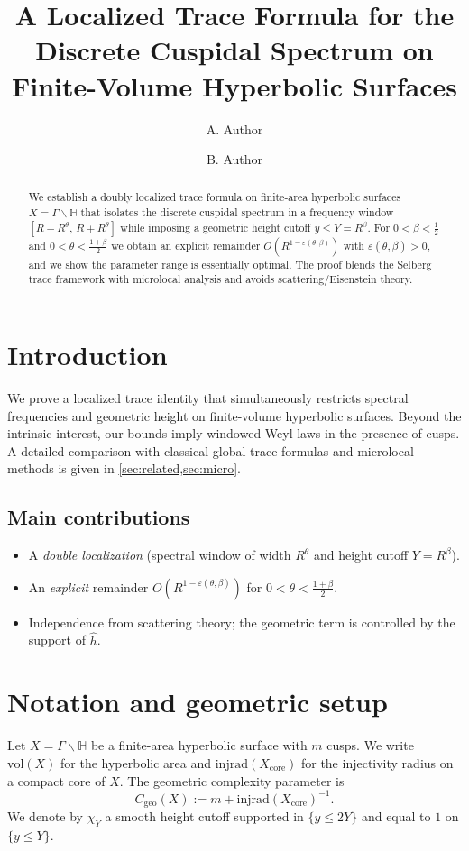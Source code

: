 \documentclass[11pt]{amsart}
\title[A Localized Trace Formula]{A Localized Trace Formula for the Discrete Cuspidal Spectrum on Finite-Volume Hyperbolic Surfaces}
\author{A. Author}
\author{B. Author}
\numberwithin{equation}{section}
\theoremstyle{definition}
\theoremstyle{remark}
\newcommand{\HH}{\mathbb{H}}
\newcommand{\vol}{\mathrm{vol}}
\newcommand{\injrad}{\mathrm{injrad}}
\begin{document}
\begin{abstract}
We establish a doubly localized trace formula on finite-area hyperbolic surfaces
$X=\Gamma\backslash\HH$ that isolates the discrete cuspidal spectrum in a frequency
window $[R-R^\theta,\,R+R^\theta]$ while imposing a geometric height cutoff $y\le Y=R^\beta$.
For $0<\beta<\tfrac12$ and $0<\theta<\tfrac{1+\beta}{2}$ we obtain an explicit remainder
$O\!\left(R^{1-\varepsilon(\theta,\beta)}\right)$ with $\varepsilon(\theta,\beta)>0$, and we
show the parameter range is essentially optimal. The proof blends the Selberg trace
framework with microlocal analysis and avoids scattering/Eisenstein theory.
\end{abstract}

\maketitle

\section{Introduction}
We prove a localized trace identity that simultaneously restricts spectral
frequencies and geometric height on finite-volume hyperbolic surfaces. Beyond
the intrinsic interest, our bounds imply windowed Weyl laws in the presence of cusps.
A detailed comparison with classical global trace formulas and microlocal methods
is given in \cref{sec:related,sec:micro}.

\subsection*{Main contributions}
\begin{itemize}
  \item A \emph{double localization} (spectral window of width $R^\theta$ and height cutoff $Y=R^\beta$).
  \item An \emph{explicit} remainder $O(R^{1-\varepsilon(\theta,\beta)})$ for $0<\theta<\frac{1+\beta}{2}$.
  \item Independence from scattering theory; the geometric term is controlled by the support of $\widehat{h}$.
\end{itemize}

\section{Notation and geometric setup}\label{sec:notation}
Let $X=\Gamma\backslash\HH$ be a finite-area hyperbolic surface with $m$ cusps.
We write $\vol(X)$ for the hyperbolic area and $\injrad(X_{\mathrm{core}})$ for the
injectivity radius on a compact core of $X$. The geometric complexity parameter is
\[
  C_{\mathrm{geo}}(X):=m+\injrad(X_{\mathrm{core}})^{-1}.
\]
We denote by $\chi_Y$ a smooth height cutoff supported in $\{y\le 2Y\}$ and equal to $1$ on $\{y\le Y\}$.
\end{document}
